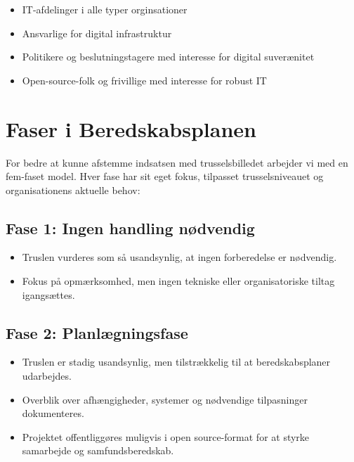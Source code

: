 \documentclass[a4paper,11pt,oneside]{book}
\def\tightlist{}
\begin{document}
\begin{itemize}
\tightlist
\item
  IT-afdelinger i alle typer orginsationer
\item
  Ansvarlige for digital infrastruktur
\item
  Politikere og beslutningstagere med interesse for digital suverænitet
\item
  Open-source-folk og frivillige med interesse for robust IT
\end{itemize}

\newpage

\chapter{Faser i Beredskabsplanen}\label{faser-i-beredskabsplanen}

For bedre at kunne afstemme indsatsen med trusselsbilledet arbejder vi
med en fem-faset model. Hver fase har sit eget fokus, tilpasset
trusselsniveauet og organisationens aktuelle behov:

\section{Fase 1: Ingen handling
nødvendig}\label{fase-1-ingen-handling-nuxf8dvendig}

\begin{itemize}
\tightlist
\item
  Truslen vurderes som så usandsynlig, at ingen forberedelse er
  nødvendig.
\item
  Fokus på opmærksomhed, men ingen tekniske eller organisatoriske tiltag
  igangsættes.
\end{itemize}

\section{Fase 2: Planlægningsfase}\label{fase-2-planluxe6gningsfase}

\begin{itemize}
\tightlist
\item
  Truslen er stadig usandsynlig, men tilstrækkelig til at
  beredskabsplaner udarbejdes.
\item
  Overblik over afhængigheder, systemer og nødvendige tilpasninger
  dokumenteres.
\item
  Projektet offentliggøres muligvis i open source-format for at styrke
  samarbejde og samfundsberedskab.
\end{itemize}
\end{document}
